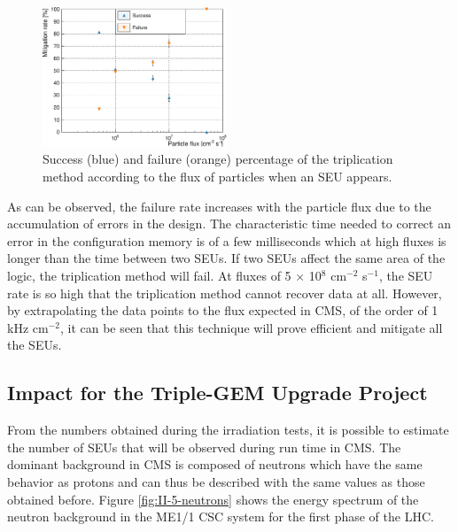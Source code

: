       \begin{figure}[h!]
        \centering
        \includegraphics[width=0.49\textwidth]{img/plots/c_l-crop}
        \caption{Success (blue) and failure (orange) percentage of the triplication method according to the flux of particles when an SEU appears.}
        \label{fig:II-5-data-triplication}
      \end{figure}

      As can be observed, the failure rate increases with the particle flux due to the accumulation of errors in the design. The characteristic time needed to correct an error in the configuration memory is of a few milliseconds which at high fluxes is longer than the time between two SEUs. If two SEUs affect the same area of the logic, the triplication method will fail. At fluxes of 5 $ \times $ 10$^8$ cm$^{-2}$ s$^{-1}$, the SEU rate is so high that the triplication method cannot recover data at all. However, by extrapolating the data points to the flux expected in CMS, of the order of 1 kHz cm$^{-2}$, it can be seen that this technique will prove efficient and mitigate all the SEUs.

    \subsection{Impact for the Triple-GEM Upgrade Project}

      From the numbers obtained during the irradiation tests, it is possible to estimate the number of SEUs that will be observed during run time in CMS. The dominant background in CMS is composed of neutrons which have the same behavior as protons \cite{Huhtinen2000155} and can thus be described with the same values as those obtained before. Figure \ref{fig:II-5-neutrons} shows the energy spectrum of the neutron background in the ME1/1 CSC system for the first phase of the LHC. \\

